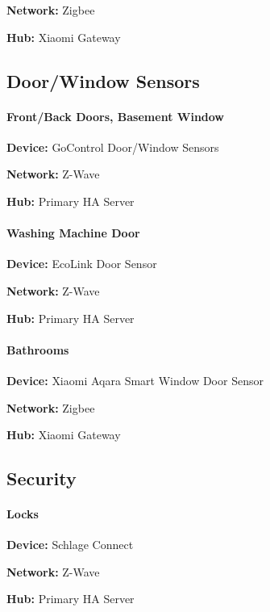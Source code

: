 \documentclass[]{article}
\let\oldparagraph\paragraph
\renewcommand{\paragraph}[1]{\oldparagraph{#1}\mbox{}}
\begin{document}
\begin{multicols}{2}
\textbf{Network: }
{Zigbee}

\textbf{Hub: }
{Xiaomi Gateway}

\subsection{\texorpdfstring{{Door/Window Sensors}}{Door/Window Sensors}}

\paragraph{\texorpdfstring{{Front/Back Doors, Basement Window}}{Front/Back Doors, Basement Window}}

\textbf{Device: }
{GoControl Door/Window Sensors}

\textbf{Network: }
{Z-Wave}

\textbf{Hub: }
{Primary HA Server}

\paragraph{\texorpdfstring{{Washing Machine Door}}{Washing Machine Door}}

\textbf{Device: }
{EcoLink Door Sensor}

\textbf{Network: }
{Z-Wave}

\textbf{Hub: }
{Primary HA Server}

\paragraph{\texorpdfstring{{Bathrooms}}{Bathrooms}}

\textbf{Device: }
{Xiaomi Aqara Smart Window Door Sensor}

\textbf{Network: }
{Zigbee}

\textbf{Hub: }
{Xiaomi Gateway}

\subsection{\texorpdfstring{{Security}}{Security}}

\paragraph{\texorpdfstring{{Locks}}{Locks}}

\textbf{Device: }
{Schlage Connect}

\textbf{Network: }
{Z-Wave}

\textbf{Hub: }
{Primary HA Server}


\end{multicols}
\end{document}
